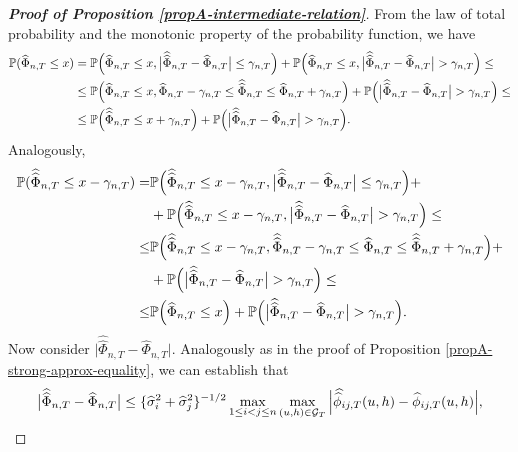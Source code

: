 \documentclass[a4paper,12pt]{article}
\newcommand{\doublehat}[1]{\skew{5.5}\widehat{\widehat{#1}}}
\newcommand{\doublehattwo}[1]{\widehat{\widehat{#1}}}
\begin{document}
\begin{proof}[\textnormal{\textbf{Proof of Proposition \ref{propA-intermediate-relation}}}] 
From the law of total probability and the monotonic property of the probability function, we have
\begin{align*} \pr(\widehat{\Phi}_{n, T} \le x) &= \pr \Big(\widehat{\Phi}_{n, T} \le x, \big|\doublehattwo{\Phi}_{n,T} - \widehat{\Phi}_{n,T}\big| \le \gamma_{n, T} \Big) + \pr \Big(\widehat{\Phi}_{n, T} \le x, \big|\doublehattwo{\Phi}_{n,T} - \widehat{\Phi}_{n,T}\big| > \gamma_{n, T} \Big) \le \\
& \le  \pr \Big(\widehat{\Phi}_{n, T} \le x, \widehat{\Phi}_{n,T} - \gamma_{n, T} \le \doublehattwo{\Phi}_{n,T} \le \widehat{\Phi}_{n,T} + \gamma_{n, T} \Big) + \pr \Big(\big|\doublehattwo{\Phi}_{n,T} - \widehat{\Phi}_{n,T}\big| > \gamma_{n, T} \Big) \le \\
& \le  \pr \Big(\doublehattwo{\Phi}_{n,T} \le x + \gamma_{n, T} \Big) + \pr \Big(\big|\doublehattwo{\Phi}_{n,T} - \widehat{\Phi}_{n,T}\big| > \gamma_{n, T} \Big).
\end{align*}
Analogously, 
\begin{align*} \pr(\doublehattwo{\Phi}_{n, T} \le x - \gamma_{n, T}) =& \pr \Big(\doublehattwo{\Phi}_{n, T} \le x - \gamma_{n, T}, \big|\doublehattwo{\Phi}_{n,T} - \widehat{\Phi}_{n,T}\big| \le \gamma_{n, T} \Big) +\\
&+ \pr \Big(\doublehattwo{\Phi}_{n, T} \le x - \gamma_{n, T}, \big|\doublehattwo{\Phi}_{n,T} - \widehat{\Phi}_{n,T}\big| > \gamma_{n, T} \Big) \le \\
 \le&  \pr \Big(\doublehattwo{\Phi}_{n, T} \le x - \gamma_{n, T}, \doublehattwo{\Phi}_{n, T} - \gamma_{n, T} \le \widehat{\Phi}_{n,T} \le \doublehattwo{\Phi}_{n, T} + \gamma_{n, T} \Big) +\\
 &+  \pr \Big(\big|\doublehattwo{\Phi}_{n,T} - \widehat{\Phi}_{n,T}\big| > \gamma_{n, T} \Big) \le \\
 \le &  \pr \Big(\widehat{\Phi}_{n,T} \le x \Big) + \pr \Big(\big|\doublehattwo{\Phi}_{n,T} - \widehat{\Phi}_{n,T}\big| > \gamma_{n, T} \Big).
\end{align*}
Now consider $\big|\doublehattwo{\Phi}_{n,T} - \widehat{\Phi}_{n,T}\big|$. Analogously as in the proof of Proposition \ref{propA-strong-approx-equality}, we can establish that
\begin{align*}
\big| \doublehattwo{\Phi}_{n, T} - \widehat{\Phi}_{n, T} \big| \le \{\widehat{\sigma}_i^2 + \widehat{\sigma}_j^2 \}^{-1/2} \max_{1\le i < j \le n} \max_{(u,h) \in \mathcal{G}_T} \Big| \doublehat{\phi}_{ij, T}(u,h) - \widehat{\phi}_{ij, T}(u,h) \Big|,

\end{align*}
\end{proof}
\end{document}
